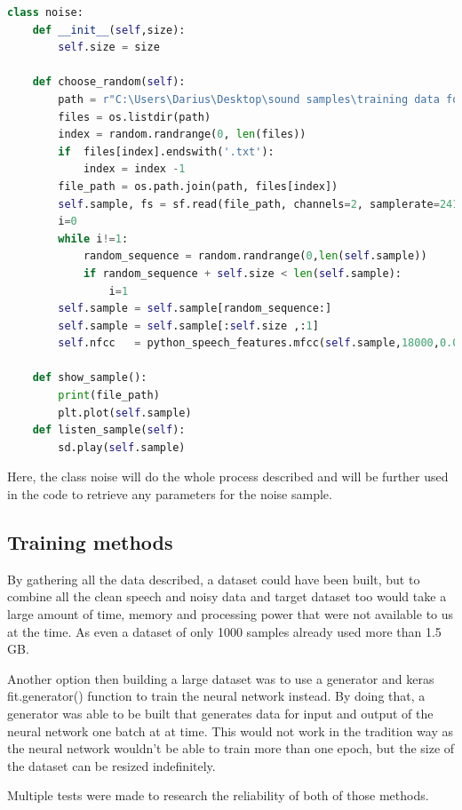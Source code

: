 \begin{lstlisting}[language=Python, caption=Noise sample gathering class]
class noise:
    def __init__(self,size):
        self.size = size
    
    def choose_random(self):
        path = r"C:\Users\Darius\Desktop\sound samples\training data for RNN\rnnoise_contributions"
        files = os.listdir(path)
        index = random.randrange(0, len(files))
        if  files[index].endswith('.txt'):
            index = index -1
        file_path = os.path.join(path, files[index])
        self.sample, fs = sf.read(file_path, channels=2, samplerate=24100,format='RAW', subtype='PCM_16')
        i=0
        while i!=1:
            random_sequence = random.randrange(0,len(self.sample))
            if random_sequence + self.size < len(self.sample):
                i=1
        self.sample = self.sample[random_sequence:]
        self.sample = self.sample[:self.size ,:1]
        self.nfcc   = python_speech_features.mfcc(self.sample,18000,0.025,0.01,24)
        
    def show_sample():
        print(file_path)
        plt.plot(self.sample)
    def listen_sample(self):
        sd.play(self.sample) 

\end{lstlisting}

Here, the class noise will do the whole process described and will be further used in the code to retrieve any parameters for the noise sample.

\subsection{Training methods}
By gathering all the data described, a dataset could have been built, but to combine all the clean speech and noisy data and target dataset too would take a large amount of time, memory and processing power that were not available to us at the time. As even  a dataset of only 1000 samples already used more than 1.5 GB.

Another option then building a large dataset was to use a generator and keras fit.generator() function to train the neural network instead. By doing that, a generator was able to be built that generates data for input and output of the neural network one batch at at time. This would not work in the tradition way as the neural network wouldn't be able to train more than one epoch, but the size of the dataset can be resized indefinitely.

Multiple tests were made to research the reliability of both of those methods.

